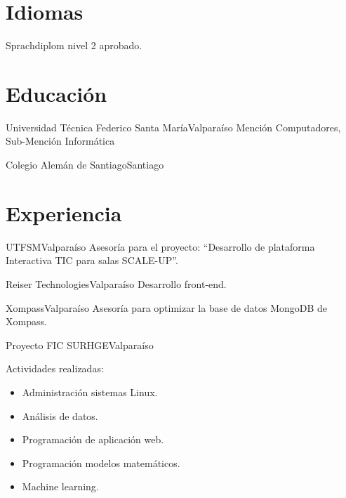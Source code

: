 \documentclass[11pt,letterpaper,sans]{moderncv}
\begin{document}
  \makecvtitle{}

  \section{Idiomas}
      {Sprachdiplom nivel 2 aprobado.}

  \section{Educación}
      {Universidad Técnica Federico Santa María}{Valparaíso}
      {}
      {Mención Computadores, Sub-Mención Informática}

      {Colegio Alemán de Santiago}{Santiago}{}
      {}

  \section{Experiencia}
    {UTFSM}{Valparaíso}{}
    {
      Asesoría para el proyecto: ``Desarrollo de plataforma
      Interactiva TIC para salas SCALE-UP''.
    }

    \pagebreak[0]

      {Reiser Technologies}{Valparaíso}{}
      {
        Desarrollo front-end.
      }

    \pagebreak[0]

      {Xompass}{Valparaíso}{}
      {
        Asesoría para optimizar la base de datos MongoDB de
        Xompass.
      }

    \pagebreak[0]

      {Proyecto FIC SURHGE}{Valparaíso}{}
      {
        Actividades realizadas:
        \begin{itemize}
          \item Administración sistemas Linux.
          \item Análisis de datos.
          \item Programación de aplicación web.
          \item Programación modelos matemáticos.
          \item Machine learning.
        \end{itemize}
      }
\end{document}
